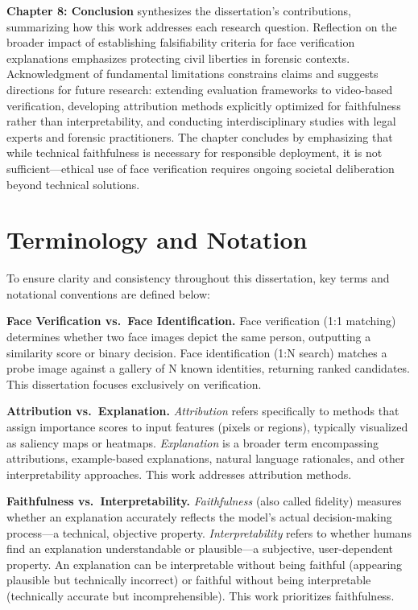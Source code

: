 \textbf{Chapter 8: Conclusion} synthesizes the dissertation's contributions, summarizing how this work addresses each research question. Reflection on the broader impact of establishing falsifiability criteria for face verification explanations emphasizes protecting civil liberties in forensic contexts. Acknowledgment of fundamental limitations constrains claims and suggests directions for future research: extending evaluation frameworks to video-based verification, developing attribution methods explicitly optimized for faithfulness rather than interpretability, and conducting interdisciplinary studies with legal experts and forensic practitioners. The chapter concludes by emphasizing that while technical faithfulness is necessary for responsible deployment, it is not sufficient---ethical use of face verification requires ongoing societal deliberation beyond technical solutions.

\section{Terminology and Notation}
\label{sec:terminology}

To ensure clarity and consistency throughout this dissertation, key terms and notational conventions are defined below:

\textbf{Face Verification vs.\ Face Identification.} Face verification (1:1 matching) determines whether two face images depict the same person, outputting a similarity score or binary decision. Face identification (1:N search) matches a probe image against a gallery of N known identities, returning ranked candidates. This dissertation focuses exclusively on verification.

\textbf{Attribution vs.\ Explanation.} \emph{Attribution} refers specifically to methods that assign importance scores to input features (pixels or regions), typically visualized as saliency maps or heatmaps. \emph{Explanation} is a broader term encompassing attributions, example-based explanations, natural language rationales, and other interpretability approaches. This work addresses attribution methods.

\textbf{Faithfulness vs.\ Interpretability.} \emph{Faithfulness} (also called fidelity) measures whether an explanation accurately reflects the model's actual decision-making process---a technical, objective property. \emph{Interpretability} refers to whether humans find an explanation understandable or plausible---a subjective, user-dependent property. An explanation can be interpretable without being faithful (appearing plausible but technically incorrect) or faithful without being interpretable (technically accurate but incomprehensible). This work prioritizes faithfulness.

